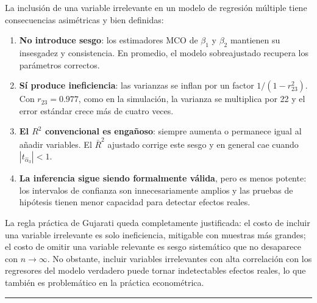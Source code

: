 \documentclass[12pt, letterpaper]{article}
\begin{document}
\begin{clave}
  La inclusión de una variable irrelevante en un modelo de regresión
  múltiple tiene consecuencias asimétricas y bien definidas:

  \begin{enumerate}[leftmargin=1.4em]
    \item \textbf{No introduce sesgo}: los estimadores MCO de $\beta_1$ y
      $\beta_2$ mantienen su insesgadez y consistencia. En promedio, el
      modelo sobreajustado recupera los parámetros correctos.

    \item \textbf{Sí produce ineficiencia}: las varianzas se inflan por un
      factor $1/(1 - r_{23}^2)$. Con $r_{23} = 0.977$, como en la
      simulación, la varianza se multiplica por 22 y el error estándar
      crece más de cuatro veces.

    \item \textbf{El $R^2$ convencional es engañoso}: siempre aumenta o
      permanece igual al añadir variables. El $\bar{R}^2$ ajustado
      corrige este sesgo y en general cae cuando $|t_{\hat{\alpha}_3}| < 1$.

    \item \textbf{La inferencia sigue siendo formalmente válida}, pero es
      menos potente: los intervalos de confianza son innecesariamente
      amplios y las pruebas de hipótesis tienen menor capacidad para
      detectar efectos reales.
  \end{enumerate}

  La regla práctica de Gujarati queda completamente justificada: el costo
  de incluir una variable irrelevante es solo ineficiencia, mitigable con
  muestras más grandes; el costo de omitir una variable relevante es sesgo
  sistemático que no desaparece con $n \to \infty$. No obstante, incluir
  variables irrelevantes con alta correlación con los regresores del modelo
  verdadero puede tornar indetectables efectos reales, lo que también es
  problemático en la práctica econométrica.
\end{clave}

\vspace{14pt}
\noindent\rule{\linewidth}{0.4pt}

\end{document}
